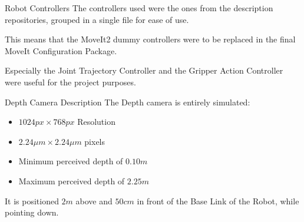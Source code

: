 \begin{frame}{Robot Controllers}
    The controllers used were the ones from the description repositories, grouped in a single file for ease of use.

    This means that the MoveIt2 dummy controllers were to be replaced in the final MoveIt Configuration Package.

    Especially the Joint Trajectory Controller and the Gripper Action Controller were useful for the project purposes.
\end{frame}
\begin{frame}{Depth Camera Description}
    The Depth camera is entirely simulated:
    \begin{itemize}
        \item $1024px \times 768px$ Resolution
        \item $2.24\mu m \times 2.24\mu m$ pixels
        \item Minimum perceived depth of $0.10 m$
        \item Maximum perceived depth of $2.25 m$
    \end{itemize}
    It is positioned $2m$ above and $50cm$ in front of the Base Link of the Robot, while pointing down.
\end{frame}
